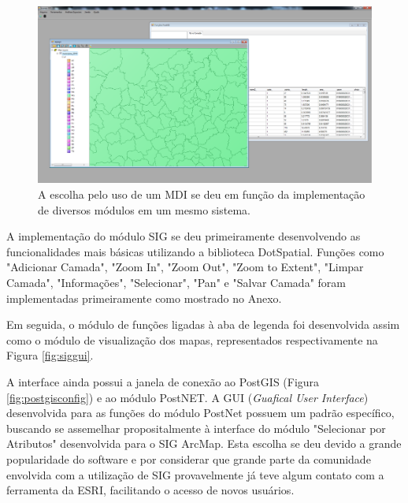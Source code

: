 	\begin{figure}
		\centering
		\includegraphics[width=1\linewidth]{data/mdi_gui}
		\caption{A escolha pelo uso de um MDI se deu em função da implementação de diversos módulos em um mesmo sistema.}
		\label{fig:mdigui}
	\end{figure}

A implementação do módulo SIG se deu primeiramente desenvolvendo as funcionalidades mais básicas utilizando a biblioteca DotSpatial. Funções como "Adicionar Camada", "Zoom In", "Zoom Out", "Zoom to Extent", "Limpar Camada", "Informações", "Selecionar", "Pan" e "Salvar Camada" foram implementadas primeiramente como mostrado no Anexo.

Em seguida, o módulo de funções ligadas à aba de legenda foi desenvolvida assim como o módulo de visualização dos mapas, representados respectivamente na Figura \ref{fig:siggui}.

A interface ainda possui a janela de conexão ao PostGIS (Figura \ref{fig:postgisconfig}) e ao módulo PostNET. A GUI (\textit{Guafical User Interface}) desenvolvida para as funções do módulo PostNet possuem um padrão específico, buscando se assemelhar propositalmente à interface do módulo "Selecionar por Atributos" desenvolvida para o SIG ArcMap. Esta escolha se deu devido a grande popularidade do software e por considerar que grande parte da comunidade envolvida com a utilização de SIG provavelmente já teve algum contato com a ferramenta da ESRI, facilitando o acesso de novos usuários.

